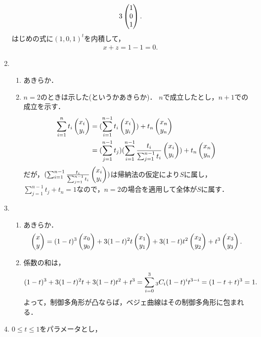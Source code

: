 \documentclass[9pt]{ltjsarticle}
\theoremstyle{break}
\theoremstyle{break}
\theoremstyle{break}
\theoremstyle{break}
\theoremstyle{break}
\theoremstyle{break}
\theoremstyle{break}
\theoremstyle{break}
\theoremstyle{break}
\theoremstyle{break}
\theoremstyle{break}
\theoremstyle{break}
\theoremstyle{break}
\theoremstyle{break}
\theoremstyle{break}
\theoremstyle{nonumberbreak}
\theoremstyle{nonumberbreak}
\begin{document}
\begin{enumerate}[label=(問題\arabic*)]
\begin{align}
3 \left(\begin{matrix} 1 \\ 0 \\ 1 \end{matrix}\right).
\end{align}
はじめの式に$(1,0,1)^t$を内積して，
\begin{align}
 x+z = 1 - 1 = 0.
\end{align}
 \item
\begin{enumerate}[label=(\alph*)]
 \item あきらか．
 \item $n=2$のときは示した(というかあきらか)．
$n$で成立したとし，$n+1$での成立を示す．
\begin{align}
 \sum_{i=1}^n t_i \left(\begin{matrix} x_i \\ y_i \end{matrix}\right)
&=
(\sum_{i=1}^{n-1}t_i \left(\begin{matrix} x_i \\ y _i \end{matrix}\right)) + t_n \left(\begin{matrix} x_n \\ y_n \end{matrix}\right)\\
 &=
(\sum_{j=1}^{n-1}t_j)(\sum_{i=1}^{n-1}\frac{t_i}{\sum_{j=1}^{n-1}t_i} \left(\begin{matrix} x_i \\ y _i \end{matrix}\right)) + t_n \left(\begin{matrix} x_n \\ y_n \end{matrix}\right)\\
\end{align}
だが，$(\sum_{i=1}^{n-1}\frac{t_i}{\sum_{j=1}^{n-1}t_i} \left(\begin{matrix} x_i \\ y _i \end{matrix}\right))$は帰納法の仮定により$S$に属し，$\sum_{j=1}^{n-1}t_j + t_n = 1$なので，$n=2$の場合を適用して全体が$S$に属す．
\end{enumerate}
 \item
\begin{enumerate}[label=(\alph*)]
 \item あきらか．
\begin{align}
 \left(\begin{matrix} x \\ y \end{matrix}\right)=
(1-t)^3 \left(\begin{matrix} x_0 \\ y_0 \end{matrix}\right)
+
3(1-t)^2t \left(\begin{matrix} x_1 \\ y_1 \end{matrix}\right)
+
3(1-t) t^2 \left(\begin{matrix} x_2 \\ y_2 \end{matrix}\right)
+
t^3 \left(\begin{matrix} x_3 \\ y _3 \end{matrix}\right).
\end{align}
 \item 係数の和は，
\begin{align}
(1-t)^3 + 3(1-t)^2 t + 3(1-t)t^2 + t^3
=
\sum_{i=0}^3 {}_{3}C_{i} (1-t)^i t^{3-i}
=
(1-t + t)^3
=
1.
\end{align}
よって，制御多角形が凸ならば，ベジェ曲線はその制御多角形に包まれる．
\end{enumerate}
 \item $0\le t \le 1$をパラメータとし，

\end{enumerate}
\end{document}
